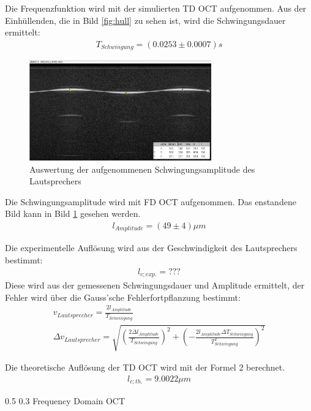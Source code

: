 \documentclass[german, %
parskip=full, %
bibliography=totoc, %
]{scrartcl}
\makeatletter
\renewcommand\subsection{\@startsection 
   {subsection}{2}{0mm}%
   {0.5\baselineskip}%
   {0.3\baselineskip}%
   {\bfseries\sffamily\large}%
   }
\makeatother
\begin{document}
Die Frequenzfunktion wird mit der simulierten TD OCT aufgenommen. Aus der Einhüllenden, die in Bild \ref{fig:hull} zu sehen ist, wird die Schwingungsdauer ermittelt:
\begin{align*}
T_{Schwingung} = (0.0253 \pm 0.0007) s
\end{align*}

\begin{figure}[hb] 
  \centering
     \includegraphics[width=0.7\textwidth]{Amplitude_Beispiel}
  \caption{Auswertung der aufgenommenen Schwingungsamplitude des Lautsprechers}
  \label{fig:amplitude}
\end{figure}

Die Schwingungsamplitude wird mit FD OCT aufgenommen. Das enstandene Bild kann in Bild \ref{fig:amplitude} gesehen werden.
\begin{align*}
l_{Amplitude} = (49 \pm 4) \mu m
\end{align*}

Die experimentelle Auflösung wird aus der Geschwindigkeit des Lautsprechers bestimmt:
\begin{align}
l_{c; exp.} = ???
\end{align}
Diese wird aus der gemessenen Schwingungsdauer und Amplitude ermittelt, der Fehler wird über die Gauss'sche Fehlerfortpflanzung bestimmt:
\begin{align}
v_{Lautsprecher} = \frac{2l_{Amplitude}}{T_{Schwingung}} \\
\Delta v_{Lautsprecher} = \sqrt{\left( \frac{2 \Delta l_{Amplitude}}{T_{Schwingung}} \right)^2 + \left(-\frac{2l_{Amplitude} \Delta T_{Schwingung}}{T_{Schwingung}^2} \right)^2}
\end{align}

Die theoretische Auflösung der TD OCT wird mit der Formel 2 berechnet. 
\begin{align*}
l_{c; th.} = 9.0022 \mu m
\end{align*}

\subsection{Frequency Domain OCT}
\end{document}
